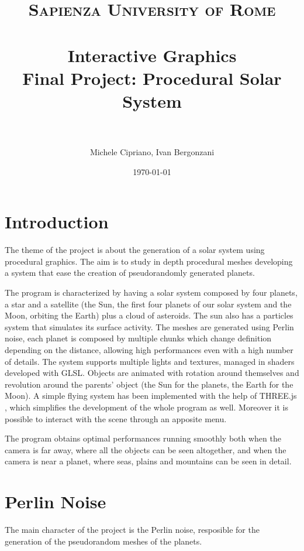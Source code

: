 \documentclass[paper=a4, fontsize=11pt]{scrartcl} %
\title{	
\normalfont \normalsize 
\textsc{Sapienza University of Rome} \\ [25pt] %
\horrule{0.5pt} \\[0.4cm] %
\huge Interactive Graphics \\ %
\large Final Project: Procedural Solar System \\
\horrule{2pt} \\[0.5cm] %
}
\author{Michele Cipriano, Ivan Bergonzani} %
\date{\normalsize\today} %
\numberwithin{equation}{section} %
\numberwithin{figure}{section} %
\numberwithin{table}{section} %
\theoremstyle{definition}
\begin{document}
\maketitle %


\section{Introduction}

The theme of the project is about the generation of a solar system using
procedural graphics. The aim is to study in depth procedural meshes developing
a system that ease the creation of pseudorandomly generated planets.

The program is characterized by having a solar system composed by four planets,
a star and a satellite (the Sun, the first four planets of our solar system and the
Moon, orbiting the Earth) plus a cloud of asteroids. The sun also has a particles system that simulates its surface activity. The meshes are generated using Perlin noise, each
planet is composed by multiple chunks which change definition depending on
the distance, allowing high performances even with a high number of details.
The system supports multiple lights and textures, managed in shaders developed
with GLSL. Objects are animated with rotation around themselves and
revolution around the parents' object (the Sun for the planets, the Earth for
the Moon). A simple flying system has been implemented with the help of
THREE.js \cite{threejs}, which simplifies the development of the whole program as well.
Moreover it is possible to interact with the scene through an apposite menu.

The program obtains optimal performances running smoothly both when the
camera is far away, where all the objects can be seen altogether, and when the camera
is near a planet, where seas, plains and mountains can be seen in detail.


\section{Perlin Noise}

The main character of the project is the Perlin noise, resposible for the
generation of the pseudorandom meshes of the planets.
\end{document}
